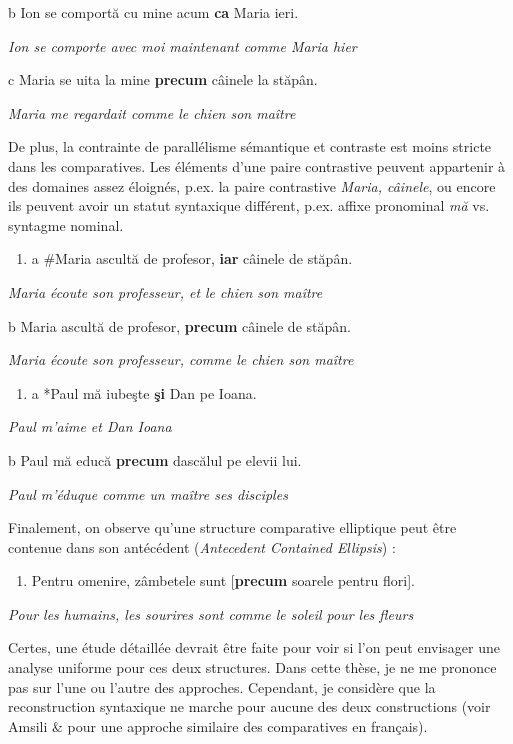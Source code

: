   b  Ion se comportă cu mine acum \textbf{ca} Maria ieri.

{\itshape
Ion se comporte avec moi maintenant comme Maria hier } 

  c  Maria se uita la mine \textbf{precum} câinele la stăpân.

{\itshape
Maria me regardait comme le chien son maître}

De plus, la contrainte de parallélisme sémantique et contraste est moins stricte dans les comparatives. Les éléments d'une paire contrastive peuvent appartenir à des domaines assez éloignés, p.ex. la paire contrastive \textit{Maria, câinele}, ou encore ils peuvent avoir un statut syntaxique différent, p.ex. affixe pronominal \textit{mă} vs. syntagme nominal.


\begin{enumerate}
\item a  \#Maria ascultă de profesor, \textbf{iar} câinele de stăpân.


\end{enumerate}
{\itshape
Maria écoute son professeur, et le chien son maître } 

  b  Maria ascultă de profesor, \textbf{precum} câinele de stăpân.

{\itshape
Maria écoute son professeur, comme le chien son maître } 


\begin{enumerate}
\item a  *Paul mă iubeşte \textbf{şi} Dan pe Ioana.


\end{enumerate}
{\itshape
Paul m'aime et Dan Ioana } 

  b  Paul mă educă \textbf{precum} dascălul pe elevii lui.

{\itshape
Paul m'éduque comme un maître ses disciples } 

Finalement, on observe qu'une structure comparative elliptique peut être contenue dans son antécédent (\textit{Antecedent Contained Ellipsis}) :


\begin{enumerate}
\item Pentru omenire, zâmbetele sunt [\textbf{precum} soarele pentru flori].


\end{enumerate}
  \textit{Pour les humains, les sourires sont comme le soleil pour les fleurs}

Certes, une étude détaillée devrait être faite pour voir si l'on peut envisager une analyse uniforme pour ces deux structures. Dans cette thèse, je ne me prononce pas sur l'une ou l'autre des approches. Cependant, je considère que la reconstruction syntaxique ne marche pour aucune des deux constructions (voir Amsili \& \citet{Desmets2008} pour une approche similaire des comparatives en français). 


